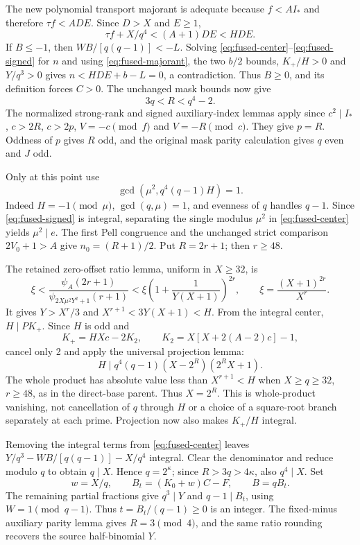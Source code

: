 The new polynomial transport majorant is adequate because $f<AI_*$
and therefore $\tau f<ADE$. Since $D>X$ and $E\ge1$,
\begin{equation}\label{eq:fused-majorant}
       \tau f+X/q^4<(A+1)DE<HDE.
\end{equation}
If $B\le-1$, then $WB/[q(q-1)]<-L$. Solving
\eqref{eq:fused-center}--\eqref{eq:fused-signed} for $n$ and using
\eqref{eq:fused-majorant}, the two $b/2$ bounds, $K_+/H>0$ and $Y/q^3>0$
gives $n<HDE+b-L=0$, a contradiction. Thus $B\ge0$, and its definition
forces $C>0$. The unchanged mask bounds now give
\[
                         3q<R<q^4-2.
\]
The normalized strong-rank and signed auxiliary-index lemmas apply since
$c^2\mid I_*$, $c>2R$, $c>2p$, $V=-c\pmod f$ and $V=-R\pmod c$.
They give $p=R$. Oddness of $p$ gives $R$ odd, and the original mask
parity calculation gives $q$ even and $J$ odd.

Only at this point use
\[
                   \gcd(\mu^2,q^4(q-1)H)=1.
\]
Indeed $H=-1\pmod\mu$, $\gcd(q,\mu)=1$, and evenness of $q$ handles
$q-1$. Since \eqref{eq:fused-signed} is integral, separating the single
modulus $\mu^2$ in \eqref{eq:fused-center} yields $\mu^2\mid e$.
The first Pell congruence and the unchanged strict comparison
$2V_0+1>A$ give $n_0=(R+1)/2$. Put $R=2r+1$; then $r\ge48$.

The retained zero-offset ratio lemma, uniform in $X\ge32$, is
\[
 \xi<\frac{\psi_A(2r+1)}{\psi_{2X\mu^2Y^2+1}(r+1)}
       <\xi\left(1+\frac1{Y(X+1)}\right)^{2r},
 \qquad \xi=\frac{(X+1)^{2r}}{X^r}.
\]
It gives $Y>X^r/3$ and $X^{r+1}<3Y(X+1)<H$. From the integral center,
$H\mid PK_+$. Since $H$ is odd and
\[
 K_+=HXc-2K_2,\qquad K_2=X[X+2(A-2)c]-1,
\]
cancel only 2 and apply the universal projection lemma:
\[
          H\mid q^4(q-1)(X-2^R)(2^RX+1).
\]
The whole product has absolute value less than $X^{r+1}<H$ when
$X\ge q\ge32$, $r\ge48$, as in the direct-base parent. Thus $X=2^R$.
This is whole-product vanishing, not cancellation of $q$ through $H$ or
a choice of a square-root branch separately at each prime. Projection
now also makes $K_+/H$ integral.

Removing the integral terms from \eqref{eq:fused-center} leaves
$Y/q^3-WB/[q(q-1)]-X/q^4$ integral. Clear the denominator and reduce
modulo $q$ to obtain $q\mid X$. Hence $q=2^\kappa$; since
$R>3q>4\kappa$, also $q^4\mid X$. Set
\[
 w=X/q,\qquad B_t=(K_0+w)C-F,\qquad B=qB_t.
\]
The remaining partial fractions give $q^3\mid Y$ and $q-1\mid B_t$,
using $W=1\pmod{q-1}$. Thus $t=B_t/(q-1)\ge0$ is an integer.
The fixed-minus auxiliary parity lemma gives $R=3\pmod4$, and the
same ratio rounding recovers the source half-binomial $Y$.

